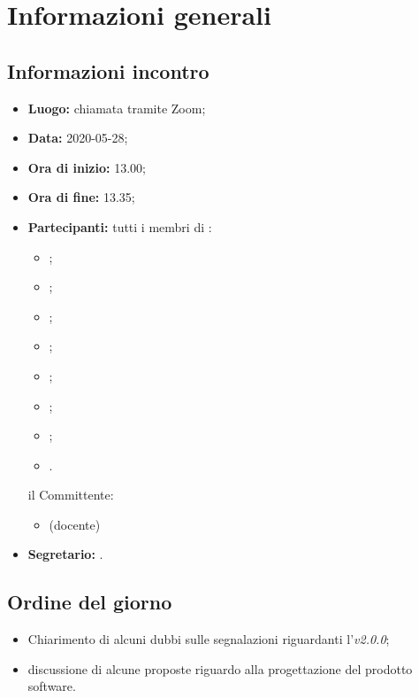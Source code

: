 \section{Informazioni generali}
\subsection{Informazioni incontro}
\begin{itemize}
	\item \textbf{Luogo:} chiamata tramite Zoom;
	\item \textbf{Data:} 2020-05-28;
	\item \textbf{Ora di inizio:} 13.00;
	\item \textbf{Ora di fine:} 13.35;
	\item \textbf{Partecipanti:}
		tutti i membri di \Gruppo:
		\begin{itemize}
			\item \VB;
			\item \LB;
			\item \NF;
			\item \EG;
			\item \FJ;
			\item \MP;
			\item \AS;
			\item \AZ.
		\end{itemize}
		il Committente:
		\begin{itemize}
			\item \RC{} (docente)
		\end{itemize}
	\item \textbf{Segretario:} \VB.
\end{itemize}

\subsection{Ordine del giorno}
\begin{itemize}
	\item Chiarimento di alcuni dubbi sulle segnalazioni riguardanti l'\AdR{}\textit{v2.0.0};
	\item discussione di alcune proposte riguardo alla progettazione del prodotto software.
\end{itemize}
